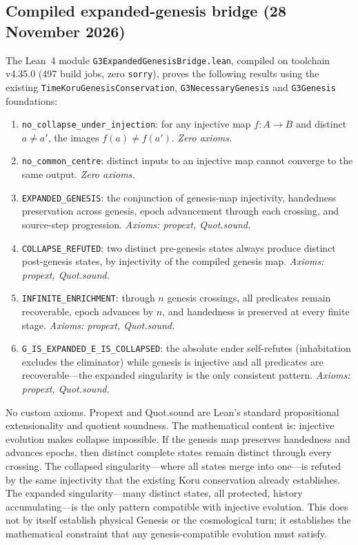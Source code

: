 \documentclass[11pt,a4paper]{article}
\begin{document}
\subsection{Compiled expanded-genesis bridge (28 November 2026)}
The Lean~4 module \texttt{G3ExpandedGenesisBridge.lean}, compiled on toolchain v4.35.0 (497 build jobs, zero \texttt{sorry}), proves the following results using the existing \texttt{TimeKoruGenesisConservation}, \texttt{G3NecessaryGenesis} and \texttt{G3Genesis} foundations:
\begin{enumerate}
\item \texttt{no\_collapse\_under\_injection}: for any injective map $f:A\to B$ and distinct $a\ne a'$, the images $f(a)\ne f(a')$. \emph{Zero axioms.}
\item \texttt{no\_common\_centre}: distinct inputs to an injective map cannot converge to the same output. \emph{Zero axioms.}
\item \texttt{EXPANDED\_GENESIS}: the conjunction of genesis-map injectivity, handedness preservation across genesis, epoch advancement through each crossing, and source-step progression. \emph{Axioms: propext, Quot.sound.}
\item \texttt{COLLAPSE\_REFUTED}: two distinct pre-genesis states always produce distinct post-genesis states, by injectivity of the compiled genesis map. \emph{Axioms: propext, Quot.sound.}
\item \texttt{INFINITE\_ENRICHMENT}: through $n$ genesis crossings, all predicates remain recoverable, epoch advances by $n$, and handedness is preserved at every finite stage. \emph{Axioms: propext, Quot.sound.}
\item \texttt{G\_IS\_EXPANDED\_E\_IS\_COLLAPSED}: the absolute ender self-refutes (inhabitation excludes the eliminator) while genesis is injective and all predicates are recoverable---the expanded singularity is the only consistent pattern. \emph{Axioms: propext, Quot.sound.}
\end{enumerate}
No custom axioms. Propext and Quot.sound are Lean's standard propositional extensionality and quotient soundness. The mathematical content is: injective evolution makes collapse impossible. If the genesis map preserves handedness and advances epochs, then distinct complete states remain distinct through every crossing. The collapsed singularity---where all states merge into one---is refuted by the same injectivity that the existing Koru conservation already establishes. The expanded singularity---many distinct states, all protected, history accumulating---is the only pattern compatible with injective evolution. This does not by itself establish physical Genesis or the cosmological turn; it establishes the mathematical constraint that any genesis-compatible evolution must satisfy.
\end{document}
